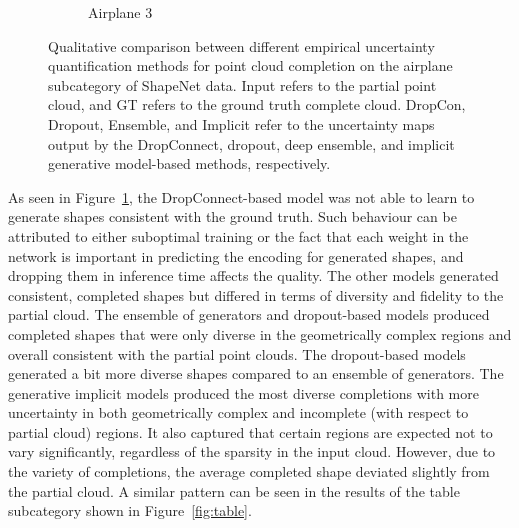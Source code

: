 \begin{figure}[htb]
\begin{subfigure}[t]{0.315\textwidth}
            \caption{Airplane 3}
          \end{subfigure}
          \caption{Qualitative comparison between different empirical uncertainty quantification methods for point cloud completion on the airplane subcategory of ShapeNet data. Input refers to the partial point cloud, and GT refers to the ground truth complete cloud. DropCon, Dropout, Ensemble, and Implicit refer to the uncertainty maps output by the DropConnect, dropout, deep ensemble, and implicit generative model-based methods, respectively.}
          \label{fig:airplane}
        \end{figure}
        \newline
        
        As seen in Figure~\ref{fig:airplane}, the DropConnect-based model was not able to learn to generate shapes consistent with the ground truth. Such behaviour can be attributed to either suboptimal training or the fact that each weight in the network is important in predicting the encoding for generated shapes, and dropping them in inference time affects the quality. The other models generated consistent, completed shapes but differed in terms of diversity and fidelity to the partial cloud. The ensemble of generators and dropout-based models produced completed shapes that were only diverse in the geometrically complex regions and overall consistent with the partial point clouds. The dropout-based models generated a bit more diverse shapes compared to an ensemble of generators. The generative implicit models produced the most diverse completions with more uncertainty in both geometrically complex and incomplete (with respect to partial cloud) regions. It also captured that certain regions are expected not to vary significantly, regardless of the sparsity in the input cloud. However, due to the variety of completions, the average completed shape deviated slightly from the partial cloud. A similar pattern can be seen in the results of the table subcategory shown in Figure~\ref{fig:table}.
        
